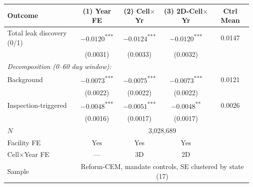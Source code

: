 \begin{tabular}{lcccc}
\toprule
Outcome & (1) Year FE & (2) Cell$\times$Yr & (3) 2D-Cell$\times$Yr & Ctrl Mean \\
\midrule
Total leak discovery (0/1)        & $-0.0120$\textsuperscript{***} & $-0.0124$\textsuperscript{***} & $-0.0120$\textsuperscript{***} & 0.0147 \\
                                  & (0.0031)                       & (0.0033)                       & (0.0032)                       &        \\[0.25em]
\multicolumn{5}{l}{\textit{Decomposition (0--60 day window):}} \\
\hspace{0.5em} Background          & $-0.0073$\textsuperscript{***} & $-0.0075$\textsuperscript{***} & $-0.0073$\textsuperscript{***} & 0.0121 \\
                                  & (0.0022)                       & (0.0022)                       & (0.0022)                       &        \\
\hspace{0.5em} Inspection-triggered & $-0.0048$\textsuperscript{***} & $-0.0051$\textsuperscript{***} & $-0.0048$\textsuperscript{**}  & 0.0026 \\
                                  & (0.0016)                       & (0.0017)                       & (0.0017)                       &        \\
\midrule
$N$                  & \multicolumn{4}{c}{3{,}028{,}689}            \\
Facility FE          & Yes      & Yes      & Yes      &              \\
Cell$\times$Year FE  & ---      & 3D       & 2D       &              \\
Sample               & \multicolumn{4}{c}{Reform-CEM, mandate controls, SE clustered by state (17)} \\
\bottomrule
\end{tabular}
